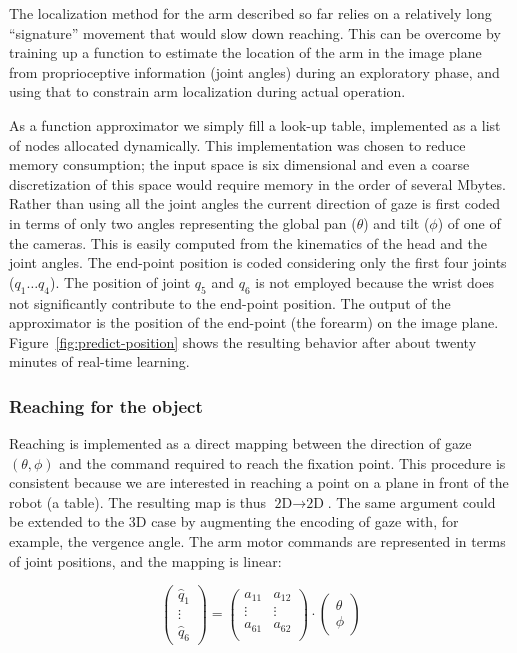 The localization method for the arm described so far relies on a
relatively long ``signature'' movement that would slow down reaching.
This can be overcome by training up a function to estimate the
location of the arm in the image plane from proprioceptive information
(joint angles) during an exploratory phase, and using that to 
constrain arm localization during actual operation.

As a function approximator we simply fill a look-up table, implemented
as a list of nodes allocated dynamically. This implementation
was chosen to reduce memory consumption; the input space is six
dimensional and even a coarse discretization of this space would require
memory in the order of several Mbytes. Rather than using all the joint angles
the current direction of gaze is first coded in terms of only two angles
representing the global pan ($\theta$) and tilt ($\phi$) of one of the cameras.
This is easily computed from the kinematics of the head and the joint angles.
The end-point position is coded considering only the first four joints 
($q_1\ldots q_4$). The position of joint $q_5$ and $q_6$ is not employed because 
the wrist does not significantly contribute to the end-point position.
The output of the approximator is the position of the end-point (the forearm) on
the image plane. Figure~\ref{fig:predict-position} shows the resulting behavior
after about twenty minutes of real-time learning. 


\subsubsection*{Reaching for the object}

Reaching is implemented as a direct mapping between the direction of gaze 
$(\theta,\phi)$ and the command required to reach the fixation point. This 
procedure is consistent because we are interested in reaching a 
point on a plane in front of the robot (a table). The resulting map is thus
$\textrm{2D} \to \textrm{2D}$. The same argument could be extended to the 3D
case by augmenting the encoding of gaze with, for example, the vergence angle. 
The arm motor commands are represented in terms of joint positions,
and the mapping is linear:

\begin{equation} \label{eq:reachmap}
\left( \begin{array}{c}
\hat{q}_1\\
\vdots\\
\hat{q}_6
\end{array}
\right) = 
\left( \begin{array}{cc}
a_{11} & a_{12} \\
\vdots & \vdots \\
a_{61} & a_{62} \\
\end{array}
\right) 
\cdot 
\left( \begin{array}{c}
\theta \\
\phi
\end{array}
\right)
\end{equation}

